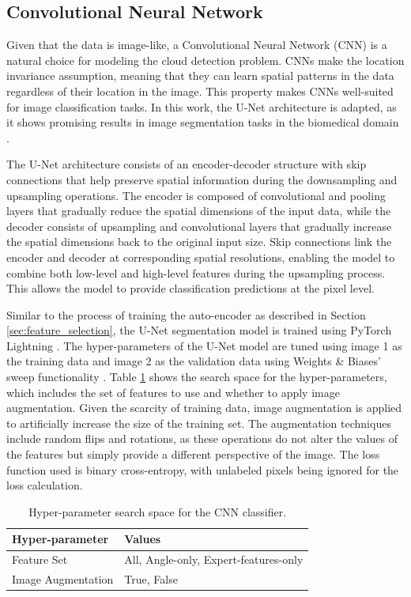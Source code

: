 \documentclass[11pt,letterpaper]{article}
\begin{document}
\subsection{Convolutional Neural Network}
Given that the data is image-like, a Convolutional Neural Network (CNN) is a natural choice for modeling the cloud detection problem. CNNs make the location invariance assumption, meaning that they can learn spatial patterns in the data regardless of their location in the image. This property makes CNNs well-suited for image classification tasks. In this work, the U-Net architecture is adapted, as it shows promising results in image segmentation tasks in the biomedical domain \parencite[]{unet}.

The U-Net architecture consists of an encoder-decoder structure with skip connections that help preserve spatial information during the downsampling and upsampling operations. The encoder is composed of convolutional and pooling layers that gradually reduce the spatial dimensions of the input data, while the decoder consists of upsampling and convolutional layers that gradually increase the spatial dimensions back to the original input size. Skip connections link the encoder and decoder at corresponding spatial resolutions, enabling the model to combine both low-level and high-level features during the upsampling process. This allows the model to provide classification predictions at the pixel level.

Similar to the process of training the auto-encoder as described in Section \ref{sec:feature_selection}, the U-Net segmentation model is trained using PyTorch Lightning \parencite[]{pytorch_lightning}. The hyper-parameters of the U-Net model are tuned using image 1 as the training data and image 2 as the validation data using Weights \& Biases' sweep functionality \parencite{wandb}. Table \ref{table:cnn_hp_space} shows the search space for the hyper-parameters, which includes the set of features to use and whether to apply image augmentation. Given the scarcity of training data, image augmentation is applied to artificially increase the size of the training set. The augmentation techniques include random flips and rotations, as these operations do not alter the values of the features but simply provide a different perspective of the image. The loss function used is binary cross-entropy, with unlabeled pixels being ignored for the loss calculation.

\begin{table}[]
\centering
\begin{tabular}{|l|l|}
\hline
\textbf{Hyper-parameter} & \textbf{Values}                      \\ \hline
Feature Set             & All, Angle-only, Expert-features-only \\
Image Augmentation      & True, False                           \\ \hline
\end{tabular}
\caption{Hyper-parameter search space for the CNN classifier.}
\label{table:cnn_hp_space}
\end{table}
\end{document}
